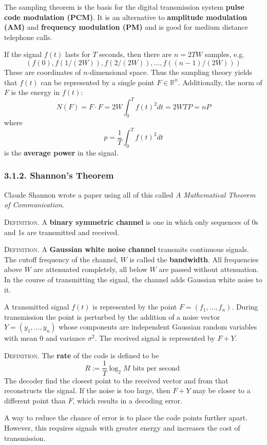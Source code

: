 \documentclass{article}
\renewcommand{\tt}[1]{\text{ #1 }}
\newcommand{\R}{\mathbb{R}}
\renewcommand{\=}{\equiv}
\newcommand{\ass}[1]{\left( #1 \right)}
\newcommand{\header}[1]{\vspace{1em}\noindent\textsc{#1.} }
\begin{document}
The sampling theorem is the basis for the digital transmission system \textbf{pulse code modulation (PCM)}.
It is an alternative to \textbf{amplitude modulation (AM)} and \textbf{frequency modulation (PM)} and is good for medium distance telephone calls.

If the signal $f(t)$ lasts for $T$ seconds, then there are $n = 2TW$ samples, e.g.
$$ \ass{ f(0), f(1/(2W)), f(2/(2W)), \dots, f((n-1)/(2W)) } $$
These are coordinates of $n$-dimensional space.
Thus the sampling theory yields that $f(t)$ can be represented by a single point $F \in \R^n$.
Additionally, the norm of $F$ is the energy in $f(t)$:
$$ N(F) = F \cdot F = 2W \int_0^T f(t)^2 dt = 2WTP = nP $$
where
$$ p = \frac 1 T \int_0^T f(t)^2 dt $$
is the \textbf{average power} in the signal.

\subsubsection*{3.1.2. Shannon's Theorem}

Claude Shannon wrote a paper using all of this called \textit{A Mathematical Theorem of Communication}.

\header{Definition}
A \textbf{binary symmetric channel} is one in which only sequences of 0s and 1s are transmitted and received.

\header{Definition}
A \textbf{Gaussian white noise channel} transmits continuous signals.
The cutoff frequency of the channel, $W$ is called the \textbf{bandwidth}.
All frequencies above $W$ are attenuated completely, all below $W$ are passed without attenuation.
In the course of transmitting the signal, the channel adds Gaussian white noise to it.

A transmitted signal $f(t)$ is represented by the point $F = (f_1, \dots, f_n)$.
During transmission the point is perturbed by the addition of a noise vector $Y = (y_1, \dots, y_n)$
whose components are independent Gaussian random variables with mean 0 and variance $\sigma^2$.
The received signal is represented by $F + Y$.

\header{Definition}
The \textbf{rate} of the code is defined to be
$$ R := \frac{1}{T} \log_2 M \tt{bits per second} $$
The decoder find the closest point to the received vector and from that reconstructs the signal.
If the noise is too large, then $F + Y$ may be closer to a different point than $F$, which results in a decoding error.

A way to reduce the chance of error is to place the code points further apart.
However, this requires signals with greater energy and increases the cost of transmission.
\end{document}
